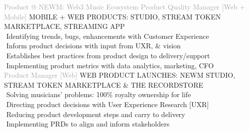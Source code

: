     
\begin{cvtable}
    {\textcolor{darkgray} {Product \newline @ NEWM: Web3 Music Ecosystem } }
    { }{{ {    } }}
%
    {\textcolor{darkgray}
    {
    Product Quality Manager [Web + Mobile] %
    }
    }
    { }%
    {
    {
    {\scriptsize
    MOBILE +
    WEB
    PRODUCTS: STUDIO, STREAM TOKEN MARKETPLACE, STREAMING APP
    } \\
     \textperiodcentered $ $ Identifying trends, bugs, enhancements with Customer Experience \\
     \textperiodcentered $ $ Inform product decisions with input from UXR, \& vision \\
     \textperiodcentered $ $ Establishes best practices from product design to delivery/support \\
     \textperiodcentered $ $ Implementing product metrics with data analytics, marketing, CFO \\
    }}
%
%
    {\textcolor{darkgray}{
    Product 
    Manager
    [Web]
    }}%
    {
    }%
    {%
    {\scriptsize
    WEB
    PRODUCT
    LAUNCHES: NEWM STUDIO, STREAM TOKEN MARKETPLACE \& THE RECORDSTORE} \\
     \textperiodcentered $ $ Solving musicians' problems: 100\% royalty ownership for life \\
     \textperiodcentered $ $ Directing product decisions with User Experience Research [UXR] \\
    \textperiodcentered $ $ Reducing product development steps and carry to delivery \\
    \textperiodcentered $ $ Implementing PRDs to align and inform stakeholders \\
}
\end{cvtable}
